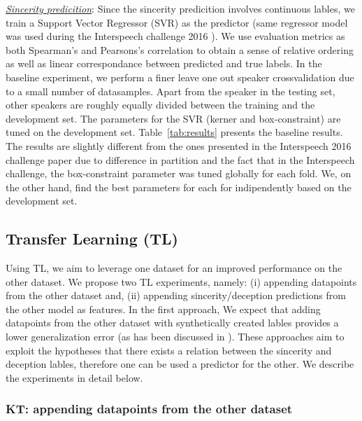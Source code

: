 \documentclass{article}
\begin{document}
\noindent\underline{\it Sincerity predicition}:
Since the sincerity predicition involves continuous lables, we train a Support Vector Regressor (SVR) as the predictor (same regressor model was used during the Interspeech challenge 2016 \cite{schuller2016interspeech}).
We use evaluation metrics as both Spearman's and Pearsons's correlation to obtain a sense of relative ordering as well as linear correspondance between predicted and true labels. 
In the baseline experiment, we perform a finer leave one out speaker crossvalidation due to a small number of datasamples.
Apart from the speaker in the testing set, other speakers are roughly equally divided between the training and the development set.
The parameters for the SVR (kerner and box-constraint) are tuned on the development set. 
Table~\ref{tab:results} presents the baseline results.
The results are slightly different from the ones presented in the Interspeech 2016 challenge paper \cite{schuller2016interspeech} due to difference in partition and the fact that in the Interspeech challenge, the box-constraint parameter was tuned globally for each fold.
We, on the other hand, find the best parameters for each for indipendently based on the development set. 

\subsection{Transfer Learning (TL)}
Using TL, we aim to leverage one dataset for an improved performance on the other dataset.
We propose two TL experiments, namely: (i) appending datapoints from the other dataset and, (ii) appending sincerity/deception predictions from the other model as features.
In the first approach, We expect that adding datapoints from the other dataset with synthetically created lables provides a lower generalization error (as has been discussed in \cite{}). 
These approaches aim to exploit the hypotheses that there exists a relation between the sincerity and deception lables, therefore one can be used a predictor for the other.
We describe the experiments in detail below. 

\subsubsection{KT: appending datapoints from the other dataset}
\end{document}
